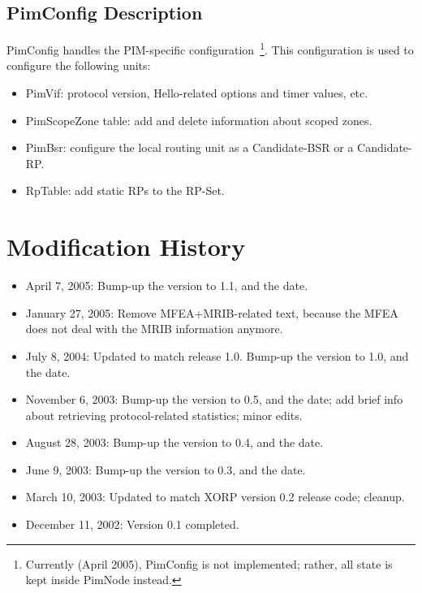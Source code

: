 \documentclass[11pt]{article}
\begin{document}
\subsection{PimConfig Description}

PimConfig handles the PIM-specific configuration~\footnote{Currently
(April 2005), PimConfig is not implemented; rather, all state is
kept inside PimNode instead.}. This configuration is used to configure the
following units:

\begin{itemize}

  \item PimVif: protocol version, Hello-related options and timer
  values, etc.

  \item PimScopeZone table: add and delete information about scoped zones.

  \item PimBsr: configure the local routing unit as a Candidate-BSR or a
  Candidate-RP.

  \item RpTable: add static RPs to the RP-Set.

\end{itemize}


\appendix
\section{Modification History}

\begin{itemize}

  \item April 7, 2005: Bump-up the version to 1.1, and the date.

  \item January 27, 2005: Remove MFEA+MRIB-related text, because the MFEA
  does not deal with the MRIB information anymore.

  \item July 8, 2004: Updated to match release 1.0. Bump-up the version to
  1.0, and the date.

  \item November 6, 2003: Bump-up the version to 0.5, and the date;
  add brief info about retrieving protocol-related statistics; minor edits.

  \item August 28, 2003: Bump-up the version to 0.4, and the date.

  \item June 9, 2003: Bump-up the version to 0.3, and the date.

  \item March 10, 2003: Updated to match XORP version 0.2 release code;
  cleanup.

  \item December 11, 2002: Version 0.1 completed.

\end{itemize}





\end{document}
